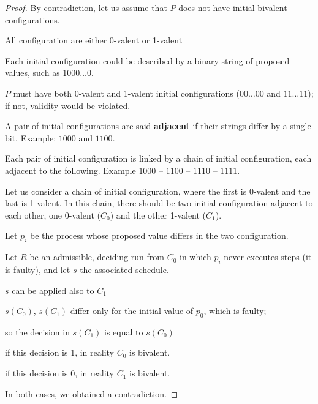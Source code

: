 \documentclass[12pt]{article}
\begin{document}
\begin{proof}
By contradiction, let us assume that $P$ does not have initial
bivalent configurations.

\BI
\item All configuration are either 0-valent or 1-valent

\item
Each initial configuration could be described by a binary string of proposed
values, such as $1000\ldots0$.

\item 
$P$ must have both 0-valent and 1-valent initial configurations ($00\ldots00$ and
$11\ldots11$); if not, validity would be violated.


\item 
A pair of initial configurations are said {\bf adjacent} if their strings differ
by a single bit. Example: $1000$ and $1100$.

\item
Each pair of initial configuration is linked by a chain of initial configuration, each adjacent
to the following. Example $1000$ -- $1100$ -- $1110$ -- $1111$.

\item Let us consider a chain of initial configuration, where the first is 
  0-valent and the last is 1-valent. In this chain, there should be
  two initial configuration adjacent to each other, one 0-valent ($C_0$) and 
  the other 1-valent ($C_1$).

\item Let $p_i$ be the process whose proposed value differs in the
  two configuration.

\item Let $R$ be an admissible, deciding run from $C_0$ in which
  $p_i$ never executes steps (it is faulty), and let $s$ the associated
  schedule.
\item $s$ can be applied also to $C_1$
\item $s(C_0)$, $s(C_1)$ differ only for the initial value of $p_0$,
  which is faulty; 
\item so the decision in $s(C_1)$ is equal to $s(C_0)$
\item if this decision is 1, in reality $C_0$ is bivalent.
\item if this decision is 0, in reality $C_1$ is bivalent.
\item In both cases, we obtained a contradiction.
\EI
\end{proof}

\newpage
\end{document}

